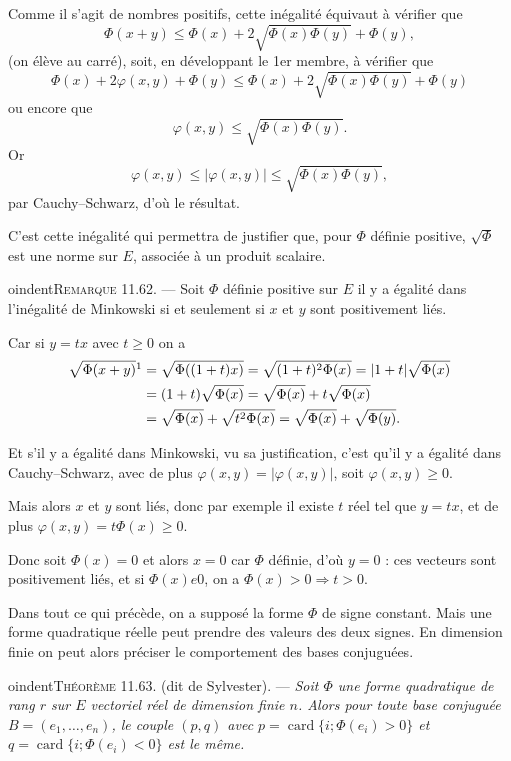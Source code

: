 Comme il s'agit de nombres positifs, cette inégalité équivaut à vérifier que
\[
\Phi(x+y)\le\Phi(x)+2\sqrt{\Phi(x)\Phi(y)}+\Phi(y),
\]
(on élève au carré), soit, en développant le 1er membre, à vérifier que
\[
\Phi(x)+2\varphi(x,y)+\Phi(y)\le\Phi(x)+2\sqrt{\Phi(x)\Phi(y)}+\Phi(y)
\]
ou encore que
\[
\varphi(x,y)\le\sqrt{\Phi(x)\Phi(y)}.
\]
Or
\[
\varphi(x,y)\le|\varphi(x,y)|\le\sqrt{\Phi(x)\Phi(y)},
\]
par Cauchy--Schwarz, d'où le résultat. \bookend

C'est cette inégalité qui permettra de justifier que, pour $\Phi$ définie positive, $\sqrt\Phi$ est une norme sur $E$, associée à un produit scalaire.

\medskip
oindent\textsc{Remarque 11.62.} --- Soit $\Phi$ définie positive sur $E$ il y a égalité dans l'inégalité de Minkowski si et seulement si $x$ et $y$ sont positivement liés.

Car si $y=tx$ avec $t\ge0$ on a
\begin{align*}
\sqrt{\Phi(x+y)}\footnotemark
&=\sqrt{\Phi((1+t)x)}
=\sqrt{(1+t)^2\Phi(x)}
=|1+t|\sqrt{\Phi(x)}\\
&=(1+t)\sqrt{\Phi(x)}
=\sqrt{\Phi(x)}+t\sqrt{\Phi(x)}\\
&=\sqrt{\Phi(x)}+\sqrt{t^2\Phi(x)}
=\sqrt{\Phi(x)}+\sqrt{\Phi(y)}.
\end{align*}

Et s'il y a égalité dans Minkowski, vu sa justification, c'est qu'il y a égalité dans Cauchy--Schwarz, avec de plus $\varphi(x,y)=|\varphi(x,y)|$, soit $\varphi(x,y)\ge0$.

Mais alors $x$ et $y$ sont liés, donc par exemple il existe $t$ réel tel que $y=tx$, et de plus $\varphi(x,y)=t\Phi(x)\ge0$.

Donc soit $\Phi(x)=0$ et alors $x=0$ car $\Phi$ définie, d'où $y=0$ : ces vecteurs sont positivement liés, et si $\Phi(x)
e0$, on a $\Phi(x)>0\Rightarrow t>0$. \bookend

Dans tout ce qui précède, on a supposé la forme $\Phi$ de signe constant. Mais une forme quadratique réelle peut prendre des valeurs des deux signes. En dimension finie on peut alors préciser le comportement des bases conjuguées.

\medskip
oindent\textsc{Théorème 11.63.} (dit de Sylvester). --- \emph{Soit $\Phi$ une forme quadratique de rang $r$ sur $E$ vectoriel réel de dimension finie $n$. Alors pour toute base conjuguée $B=(e_1,\ldots,e_n)$, le couple $(p,q)$ avec $p=\operatorname{card}\{i;\Phi(e_i)>0\}$ et $q=\operatorname{card}\{i;\Phi(e_i)<0\}$ est le même.}

